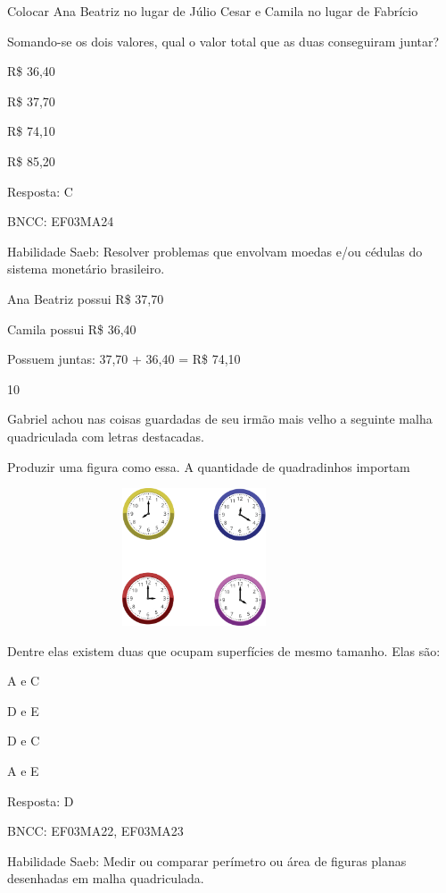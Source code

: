 \begin{escolha}
{\begin{escolha}
{Colocar Ana Beatriz no lugar de Júlio Cesar e Camila no lugar de
Fabrício

Somando-se os dois valores, qual o valor total que as duas conseguiram
juntar?

\begin{escolha}
\item
  R\$ 36,40
\item
  R\$ 37,70
\item
  R\$ 74,10
\item
  R\$ 85,20
\end{escolha}

Resposta: C

BNCC: EF03MA24

Habilidade Saeb: Resolver problemas que envolvam moedas e/ou cédulas do
sistema monetário brasileiro.

Ana Beatriz possui R\$ 37,70

Camila possui R\$ 36,40

Possuem juntas: 37,70 + 36,40 = R\$ 74,10

\num{10}

Gabriel achou nas coisas guardadas de seu irmão mais velho a seguinte
malha quadriculada com letras destacadas.

Produzir uma figura como essa. A quantidade de quadradinhos importam

\includegraphics[width=4.36538in,height=1.60417in]{media/image111.png}

Dentre elas existem duas que ocupam superfícies de mesmo tamanho. Elas
são:

\begin{escolha}
\item
  A e C
\item
  D e E
\item
  D e C
\item
  A e E
\end{escolha}

Resposta: D

BNCC: EF03MA22, EF03MA23

Habilidade Saeb: Medir ou comparar perímetro ou área de figuras planas
desenhadas em malha quadriculada.

}
\end{escolha}}
\end{escolha}
